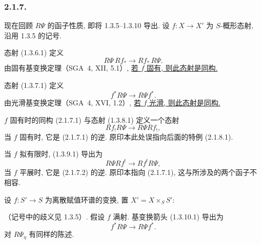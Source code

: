 \subsubsection*{2.1.7.}
现在回顾 $R\Psi$ 的函子性质, 即将 1.3.5--1.3.10 导出. 设 $f:X\longrightarrow X'$ 为 $S$-概形态射, 沿用 1.3.5 的记号.

态射 (1.3.6.1) 定义
\begin{equation}\tag{2.1.7.1}
R\Psi\,Rf_*\longrightarrow Rf_*\,R\Psi.
\end{equation}
由固有基变换定理（SGA~4, XII, 5.1）, \underline{若 $f$ 固有, 则此态射是同构.}

态射 (1.3.7.1) 定义
\begin{equation}\tag{2.1.7.2}
f^*R\Psi\longrightarrow R\Psi f^*.
\end{equation}
由光滑基变换定理（SGA~4, XVI, 1.2）, \underline{若 $f$ 光滑, 则此态射是同构.}

$f$ 固有时的同构 (2.1.7.1) 与态射 (1.3.8.1) 定义一个态射
\begin{equation}\tag{2.1.7.3}
Rf_!R\Psi\longrightarrow R\Psi Rf_!,
\end{equation}
当 $f$ 固有时, 它是 (2.1.7.1) 的逆. 原印本此处误指向后面的特例 (2.1.8.1).

当 $f$ 拟有限时, (1.3.9.1) 导出为
\begin{equation}\tag{2.1.7.4}
R\Psi Rf^!\longrightarrow Rf^!R\Psi,
\end{equation}
当 $f$ 平展时, 它是 (2.1.7.2) 的逆. 原印本指向 (2.1.7.1), 这与所涉及的两个函子不相容.

设 $f:S'\longrightarrow S$ 为离散赋值环谱的变换, 置 $X'=X\times_SS'$:
\begin{center}
\end{center}
（记号中的歧义见 1.3.5）. 假设 $f$ 满射. 基变换箭头 (1.3.10.1) 导出为
\begin{equation}\tag{2.1.7.5}
f^*R\Psi\longrightarrow R\Psi f^*.
\end{equation}
对 $R\Psi_\eta$ 有同样的陈述.

